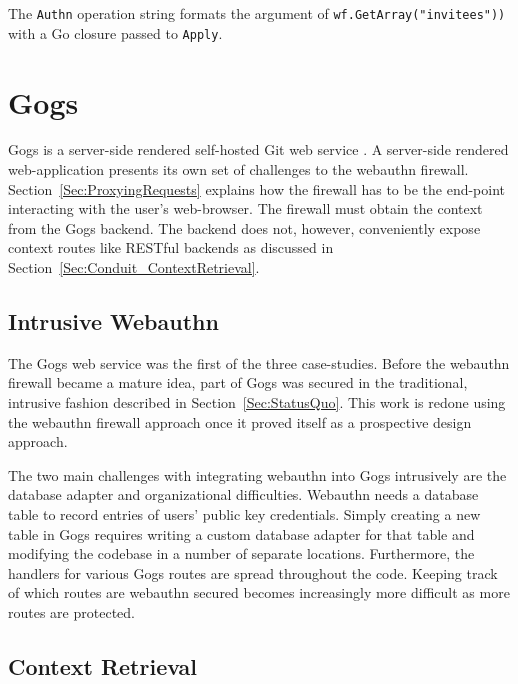 The \lstinline{Authn} operation string formats the argument of \lstinline{wf.GetArray("invitees"))} with a Go closure passed to \lstinline{Apply}.

\section{Gogs}

Gogs is a server-side rendered self-hosted Git web service \cite{TODO-gogs}. A server-side rendered web-application presents its own set of challenges to the webauthn firewall. Section~\ref{Sec:ProxyingRequests} explains how the firewall has to be the end-point interacting with the user's web-browser. The firewall must obtain the context from the Gogs backend. The backend does not, however, conveniently expose context routes like RESTful backends as discussed in Section~\ref{Sec:Conduit_ContextRetrieval}.


\subsection{Intrusive Webauthn}

The Gogs web service was the first of the three case-studies. Before the webauthn firewall became a mature idea, part of Gogs was secured in the traditional, intrusive fashion described in Section~\ref{Sec:StatusQuo}. This work is redone using the webauthn firewall approach once it proved itself as a prospective design approach.

The two main challenges with integrating webauthn into Gogs intrusively are the database adapter and organizational difficulties. Webauthn needs a database table to record entries of users' public key credentials. Simply creating a new table in Gogs requires writing a custom database adapter for that table and modifying the codebase in a number of separate locations. Furthermore, the handlers for various Gogs routes are spread throughout the code. Keeping track of which routes are webauthn secured becomes increasingly more difficult as more routes are protected.


\subsection{Context Retrieval}


